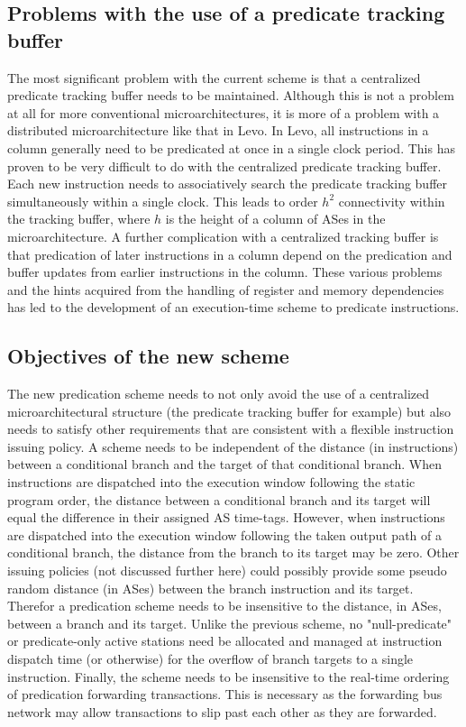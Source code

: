 \documentclass[10pt,dvips]{article}
\begin{document}
\subsection{Problems with the use of a predicate tracking buffer}
%
The most significant problem with the current scheme is that
a centralized predicate tracking buffer needs to be maintained.
Although this is not a problem at all for more conventional
microarchitectures, it is more of a problem with a distributed
microarchitecture like that in Levo.   In Levo, all instructions
in a column generally need to be predicated at once in a single
clock period.  This has proven to be very difficult to do with
the centralized predicate tracking buffer.  Each 
new instruction needs to associatively search the predicate
tracking buffer simultaneously within a single clock.  This
leads to order $ h^2 $ connectivity within the tracking buffer, 
where $ h $ is the height of a column of ASes in the microarchitecture.
A further complication with a centralized tracking buffer
is that predication of later instructions in a column depend on the
predication and buffer updates from earlier instructions in the column.
These various problems and the hints acquired from the handling
of register and memory dependencies has led to the development
of an execution-time scheme to predicate instructions.
%
\subsection{Objectives of the new scheme}
%
The new predication scheme needs to not only avoid the use of a
centralized microarchitectural structure (the predicate tracking buffer
for example) but also needs to satisfy other requirements that are
consistent with a flexible instruction issuing policy.  A scheme needs
to be independent of the distance (in instructions) between a conditional
branch and the target of that conditional branch.  When instructions
are dispatched into the execution window following the static program
order, the distance between a conditional branch and its target will
equal the difference in their assigned AS time-tags.  However, when
instructions are dispatched into the 
execution window following the taken output path
of a conditional branch, the distance from the branch to its target may
be zero.  Other issuing policies (not discussed further here) could
possibly provide some pseudo random distance (in ASes) between the
branch instruction and its target.  Therefor a predication scheme needs
to be insensitive to the distance, in ASes, between a branch and its
target.
Unlike the previous scheme, no "null-predicate" or predicate-only
active stations
need be allocated and managed at instruction dispatch time (or otherwise)
for the overflow of branch targets to a single instruction.
Finally, the scheme needs to be insensitive to the
real-time ordering of predication forwarding transactions.
This is necessary as the forwarding bus network may allow transactions
to slip past each other as they are forwarded.
%
\end{document}
